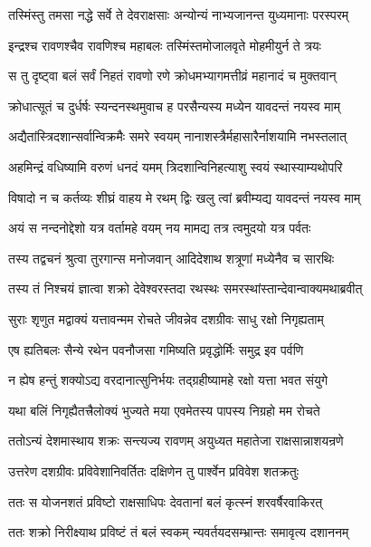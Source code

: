 \twolineshloka
{तस्मिंस्तु तमसा नद्धे सर्वे ते देवराक्षसाः}
{अन्योन्यं नाभ्यजानन्त युध्यमानाः परस्परम्} %

\twolineshloka
{इन्द्रश्च रावणश्चैव रावणिश्च महाबलः}
{तस्मिंस्तमोजालवृते मोहमीयुर्न ते त्रयः} %

\twolineshloka
{स तु दृष्ट्वा बलं सर्वं निहतं रावणो रणे}
{क्रोधमभ्यागमत्तीव्रं महानादं च मुक्तवान्} %

\twolineshloka
{क्रोधात्सूतं च दुर्धर्षः स्यन्दनस्थमुवाच ह}
{परसैन्यस्य मध्येन यावदन्तं नयस्व माम्} %

\twolineshloka
{अद्यैतांस्त्रिदशान्सर्वान्विक्रमैः समरे स्वयम्}
{नानाशस्त्रैर्महासारैर्नाशयामि नभस्तलात्} %

\twolineshloka
{अहमिन्द्रं वधिष्यामि वरुणं धनदं यमम्}
{त्रिदशान्विनिहत्याशु स्वयं स्थास्याम्यथोपरि} %

\twolineshloka
{विषादो न च कर्तव्यः शीघ्रं वाहय मे रथम्}
{द्विः खलु त्वां ब्रवीम्यद्य यावदन्तं नयस्व माम्} %

\twolineshloka
{अयं स नन्दनोद्देशो यत्र वर्तामहे वयम्}
{नय मामद्य तत्र त्वमुदयो यत्र पर्वतः} %

\twolineshloka
{तस्य तद्वचनं श्रुत्वा तुरगान्स मनोजवान्}
{आदिदेशाथ शत्रूणां मध्येनैव च सारथिः} %

\twolineshloka
{तस्य तं निश्चयं ज्ञात्वा शक्रो देवेश्वरस्तदा}
{रथस्थः समरस्थांस्तान्देवान्वाक्यमथाब्रवीत्} %

\twolineshloka
{सुराः शृणुत मद्वाक्यं यत्तावन्मम रोचते}
{जीवन्नेव दशग्रीवः साधु रक्षो निगृह्यताम्} %

\twolineshloka
{एष ह्यतिबलः सैन्ये रथेन पवनौजसा}
{गमिष्यति प्रवृद्धोर्मिः समुद्र इव पर्वणि} %

\twolineshloka
{न ह्येष हन्तुं शक्योऽद्य वरदानात्सुनिर्भयः}
{तद्ग्रहीष्यामहे रक्षो यत्ता भवत संयुगे} %

\twolineshloka
{यथा बलिं निगृह्यैतत्त्रैलोक्यं भुज्यते मया}
{एवमेतस्य पापस्य निग्रहो मम रोचते} %

\twolineshloka
{ततोऽन्यं देशमास्थाय शक्रः सन्त्यज्य रावणम्}
{अयुध्यत महातेजा राक्षसान्नाशयन्रणे} %

\twolineshloka
{उत्तरेण दशग्रीवः प्रविवेशानिवर्तितः}
{दक्षिणेन तु पार्श्वेन प्रविवेश शतक्रतुः} %

\twolineshloka
{ततः स योजनशतं प्रविष्टो राक्षसाधिपः}
{देवतानां बलं कृत्स्नं शरवर्षैरवाकिरत्} %

\twolineshloka
{ततः शक्रो निरीक्ष्याथ प्रविष्टं तं बलं स्वकम्}
{न्यवर्तयदसम्भ्रान्तः समावृत्य दशाननम्} %

